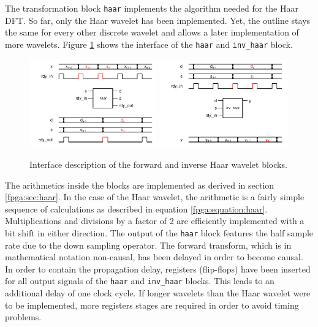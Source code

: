 \begin{refsection}
The transformation block \texttt{haar} implements the algorithm needed for the Haar DFT.
So far, only the Haar wavelet has been implemented.
Yet, the outline stays the same for every other discrete wavelet and allows a later implementation of more wavelets.
Figure \ref{fpga:fig:haar} shows the interface of the \texttt{haar} and \texttt{inv\_haar} block.
\begin{figure}
	\centering
	\includegraphics[width=0.49\textwidth]{papers/fpga/images/haar.pdf} %
	\includegraphics[width=0.49\textwidth]{papers/fpga/images/inv_haar.pdf}
	\caption{Interface description of the forward and inverse Haar wavelet blocks. \label{fpga:fig:haar}}
\end{figure}
The arithmetics inside the blocks are implemented as derived in section \ref{fpga:sec:haar}.
In the case of the Haar wavelet, the arithmetic is a fairly simple sequence of calculations as described in equation \ref{fpga:equation:haar}.
Multiplications and divisions by a factor of 2 are efficiently implemented with a bit shift in either direction.
The output of the \texttt{haar} block features the half sample rate due to the down sampling operator.
The forward transform, which is in mathematical notation non-causal, has been delayed in order to become causal.
In order to contain the propagation delay, registers (flip-flops) have been inserted for all output signals of the \texttt{haar} and \texttt{inv\_haar} blocks.
This leads to an additional delay of one clock cycle.
If longer wavelets than the Haar wavelet were to be implemented, more registers stages are required in order to avoid timing problems. %


\end{refsection}
